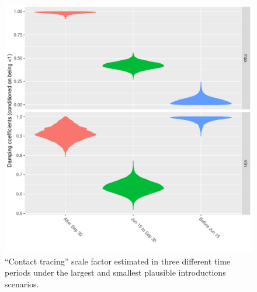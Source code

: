 \documentclass[9pt,twocolumn,twoside,lineno]{pnas-new}
\begin{document}
\begin{figure}[tbhp]
\centering
\includegraphics[width=.8\linewidth]{figures/CT_conditionedDamping_noSampUB.pdf}
\caption{``Contact tracing'' scale factor estimated in three different time periods under the largest and smallest plausible introductions scenarios.}  
\label{fig:scale-factor}
\end{figure}

\end{document}

